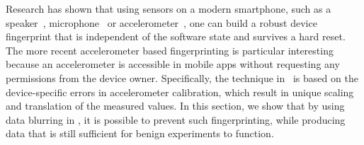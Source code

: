 Research has shown that using sensors on a modern smartphone, such as 
a speaker~\cite{das2014poster}, microphone~\cite{clarkson2012breaking} 
or accelerometer~\cite{bojinov2014mobile, dey2014accelprint}, one can 
build a robust device fingerprint that is independent of the software state
and survives a hard reset. The more recent accelerometer based fingerprinting
is particular interesting because an accelerometer is accessible in mobile apps
without requesting any permissions from the device owner. Specifically, the 
technique in~\cite{bojinov2014mobile} is based on the device-specific errors in 
accelerometer calibration, which result in unique scaling and translation of 
the measured values. In this section, we show that by using data blurring in 
\sysname, it is possible to prevent such fingerprinting, while producing data that
is still sufficient for benign experiments to function. 


